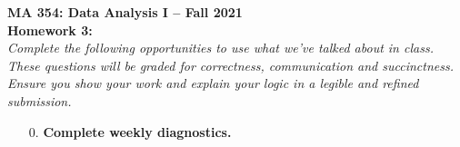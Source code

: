 \documentclass{article}\usepackage[]{graphicx}\usepackage[]{color}
\begin{document}
\noindent \textbf{MA 354: Data Analysis I -- Fall 2021}\\%
\noindent \textbf{Homework 3:}\vspace{1em}\\
\emph{Complete the following opportunities to use what we've talked about in class. These questions will be graded for correctness, communication and succinctness. Ensure you show your work and explain your logic in a legible and refined submission.}
\begin{enumerate}
\item[0.] \textbf{Complete weekly diagnostics.}
  

\end{enumerate}
\end{document}
